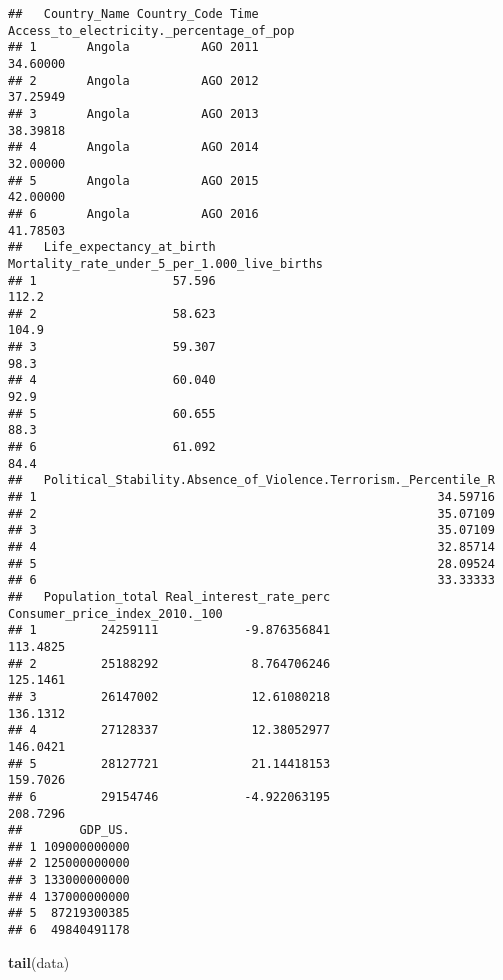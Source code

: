 \documentclass[
]{article}
\newenvironment{Shaded}{\begin{snugshade}}{\end{snugshade}}
\newcommand{\FunctionTok}[1]{\textcolor[rgb]{0.13,0.29,0.53}{\textbf{#1}}}
\newcommand{\NormalTok}[1]{#1}
\begin{document}
\begin{verbatim}
##   Country_Name Country_Code Time Access_to_electricity._percentage_of_pop
## 1       Angola          AGO 2011                                 34.60000
## 2       Angola          AGO 2012                                 37.25949
## 3       Angola          AGO 2013                                 38.39818
## 4       Angola          AGO 2014                                 32.00000
## 5       Angola          AGO 2015                                 42.00000
## 6       Angola          AGO 2016                                 41.78503
##   Life_expectancy_at_birth Mortality_rate_under_5_per_1.000_live_births
## 1                   57.596                                        112.2
## 2                   58.623                                        104.9
## 3                   59.307                                         98.3
## 4                   60.040                                         92.9
## 5                   60.655                                         88.3
## 6                   61.092                                         84.4
##   Political_Stability.Absence_of_Violence.Terrorism._Percentile_R
## 1                                                        34.59716
## 2                                                        35.07109
## 3                                                        35.07109
## 4                                                        32.85714
## 5                                                        28.09524
## 6                                                        33.33333
##   Population_total Real_interest_rate_perc Consumer_price_index_2010._100
## 1         24259111            -9.876356841                       113.4825
## 2         25188292             8.764706246                       125.1461
## 3         26147002             12.61080218                       136.1312
## 4         27128337             12.38052977                       146.0421
## 5         28127721             21.14418153                       159.7026
## 6         29154746            -4.922063195                       208.7296
##        GDP_US.
## 1 109000000000
## 2 125000000000
## 3 133000000000
## 4 137000000000
## 5  87219300385
## 6  49840491178
\end{verbatim}

\begin{Shaded}
\begin{Highlighting}[]
\FunctionTok{tail}\NormalTok{(data)}
\end{Highlighting}
\end{Shaded}
\end{document}
